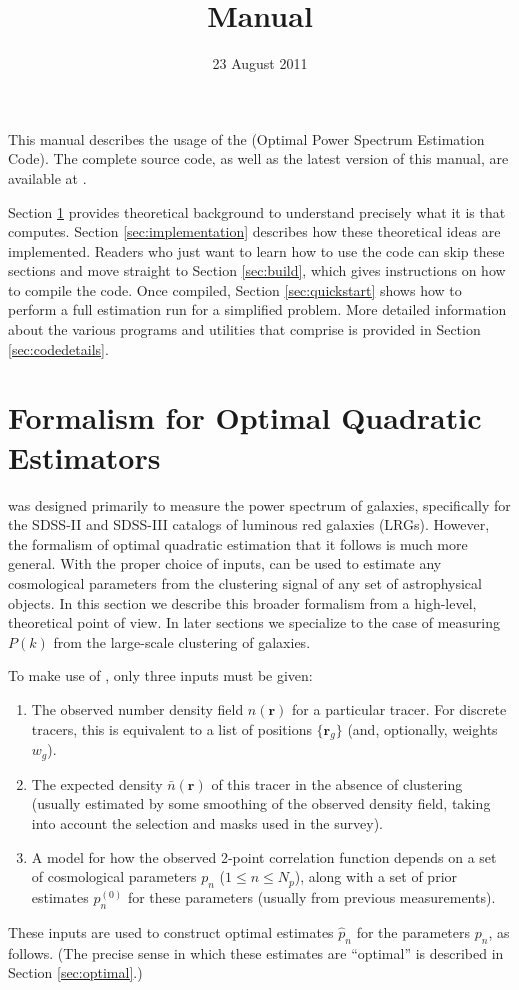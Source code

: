 \documentclass{article}
\title{\opsec \version Manual}
\date{23 August 2011}
\newcommand{\opsec}{\protect{\textrm{OPSEC}}\xspace}
\newcommand{\homepage}{\protect{\texttt{HOMEPAGE}}\xspace}
\renewcommand{\vec}[1]{\bm{#1}}
\renewcommand{\r}{\vec{r}}
\begin{document}
\maketitle

This manual describes the usage of the \opsec (Optimal Power Spectrum
Estimation Code).  The complete source code, as well as the latest version of
this manual, are available at \homepage.

Section \ref{sec:formalism} provides theoretical background to understand
precisely what it is that \opsec computes.  Section \ref{sec:implementation}
describes how these theoretical ideas are implemented.  Readers who just want
to learn how to use the code can skip these sections and move straight to
Section \ref{sec:build}, which gives instructions on how to compile the \opsec
code.  Once compiled, Section \ref{sec:quickstart} shows how to perform a full
estimation run for a simplified problem.  More detailed information about the
various programs and utilities that comprise \opsec is provided in Section
\ref{sec:codedetails}.

\tableofcontents

\section{Formalism for Optimal Quadratic Estimators}
\label{sec:formalism}

\opsec was designed primarily to measure the power spectrum of galaxies,
specifically for the SDSS-II and SDSS-III catalogs of luminous red galaxies
(LRGs).  However, the formalism of optimal quadratic estimation that it follows
is much more general.  With the proper choice of inputs, \opsec can be used to
estimate any cosmological parameters from the clustering signal of any set of
astrophysical objects.  In this section we describe this broader formalism from
a high-level, theoretical point of view.  In later sections we specialize to
the case of measuring $P(k)$ from the large-scale clustering of galaxies.

To make use of \opsec, only three inputs must be given:
\begin{enumerate}
\item The observed number density field $n(\r)$ for a particular tracer.  For
    discrete tracers, this is equivalent to a list of positions $\{\r_g\}$
    (and, optionally, weights $w_g$).
\item The expected density $\bar{n}(\r)$ of this tracer in the absence of
    clustering (usually estimated by some smoothing of the observed density
    field, taking into account the selection and masks used in the survey).
\item A model for how the observed 2-point correlation function depends on a
    set of cosmological parameters $p_n$ ($1 \le n \le N_p$), along with a set
    of prior estimates $p_n^{(0)}$ for these parameters (usually from previous
    measurements).
\end{enumerate}
These inputs are used to construct optimal estimates $\hat{p}_n$ for the
parameters $p_n$, as follows.  (The precise sense in which these estimates are
``optimal'' is described in Section \ref{sec:optimal}.)
\end{document}
